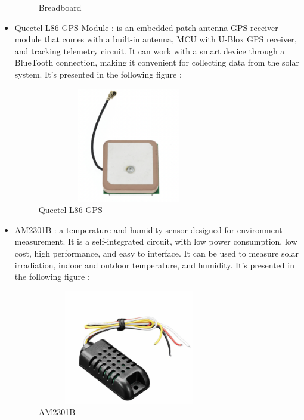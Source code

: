 \documentclass{report}
\begin{document}
\begin{itemize}
\begin{figure}[h!]
    \caption{Breadboard}
    \label{fig:my_label}
    \end{figure}\newpage
    \item Quectel L86 GPS Module : is an embedded patch antenna GPS receiver module that comes with a built-in antenna, MCU with U-Blox GPS receiver, and tracking telemetry circuit. It can work with a smart device through a BlueTooth connection, making it convenient for collecting data from the solar system. It's presented in the following figure :
    \begin{figure}[h!]
    \centering
    \includegraphics[width=8cm, height=5cm] {gps.png}
    \caption{Quectel L86 GPS}
    \label{fig:my_label}
    \end{figure}\hfill \break
    \item AM2301B : a temperature and humidity sensor designed for environment measurement. It is a self-integrated circuit, with low power consumption, low cost, high performance, and easy to interface. It can be used to measure solar irradiation, indoor and outdoor temperature, and humidity. It's presented in the following figure :
    \begin{figure}[h!]
    \centering
    \includegraphics[width=8cm, height=5cm] {temper.png}
    \caption{AM2301B}
    \label{fig:my_label}
    \end{figure}\hfill \break \\
    

\end{itemize}
\end{document}
